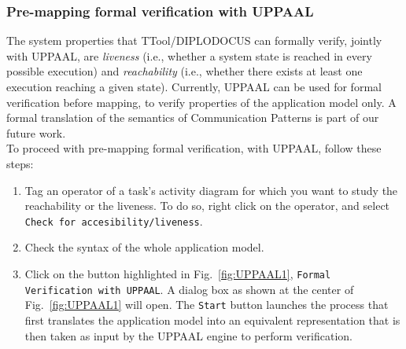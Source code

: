 \documentclass{llncs}
\begin{document}
\subsubsection{Pre-mapping formal verification with UPPAAL}
The system properties that TTool/DIPLODOCUS can formally verify, jointly with
UPPAAL, are \textit{liveness} (i.e., whether a system state is reached in every
possible execution) and \textit{reachability} (i.e., whether there exists at
least one execution reaching a given state). Currently, UPPAAL can be used for
formal verification before mapping, to verify properties of the application
model only. A formal translation of the semantics of Communication Patterns is
part of our future work.\\
To proceed with pre-mapping formal verification, with UPPAAL, follow these
steps:
\begin{enumerate}
	\item Tag an operator of a task's activity diagram for which you want to study the reachability or the liveness. To
        do so, right click on the operator, and select \texttt{Check for accesibility/liveness}.
	\item Check the syntax of the whole application model.
	\item Click on the button highlighted in Fig.~\ref{fig:UPPAAL1},
	\texttt{Formal Verification with UPPAAL}. A dialog box as shown at
	the center of Fig.~\ref{fig:UPPAAL1} will open. The \texttt{Start} button
	launches the process that first translates the application model into an equivalent representation that is then taken as
	input by the UPPAAL engine to perform verification.
\end{enumerate}
%
\end{document}
